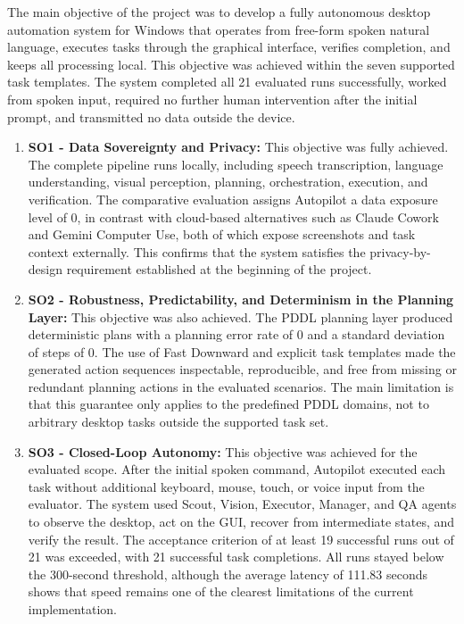 The main objective of the project was to develop a fully autonomous desktop automation system for Windows that operates from free-form spoken natural language, executes tasks through the graphical interface, verifies completion, and keeps all processing local. This objective was achieved within the seven supported task templates. The system completed all 21 evaluated runs successfully, worked from spoken input, required no further human intervention after the initial prompt, and transmitted no data outside the device.

\begin{enumerate}
\item \textbf{SO1 - Data Sovereignty and Privacy:} This objective was fully achieved. The complete pipeline runs locally, including speech transcription, language understanding, visual perception, planning, orchestration, execution, and verification. The comparative evaluation assigns Autopilot a data exposure level of 0, in contrast with cloud-based alternatives such as Claude Cowork and Gemini Computer Use, both of which expose screenshots and task context externally. This confirms that the system satisfies the privacy-by-design requirement established at the beginning of the project.

\item \textbf{SO2 - Robustness, Predictability, and Determinism in the Planning Layer:} This objective was also achieved. The PDDL planning layer produced deterministic plans with a planning error rate of 0 and a standard deviation of steps of 0. The use of Fast Downward and explicit task templates made the generated action sequences inspectable, reproducible, and free from missing or redundant planning actions in the evaluated scenarios. The main limitation is that this guarantee only applies to the predefined PDDL domains, not to arbitrary desktop tasks outside the supported task set.

\item \textbf{SO3 - Closed-Loop Autonomy:} This objective was achieved for the evaluated scope. After the initial spoken command, Autopilot executed each task without additional keyboard, mouse, touch, or voice input from the evaluator. The system used Scout, Vision, Executor, Manager, and QA agents to observe the desktop, act on the GUI, recover from intermediate states, and verify the result. The acceptance criterion of at least 19 successful runs out of 21 was exceeded, with 21 successful task completions. All runs stayed below the 300-second threshold, although the average latency of 111.83 seconds shows that speed remains one of the clearest limitations of the current implementation.


\end{enumerate}
